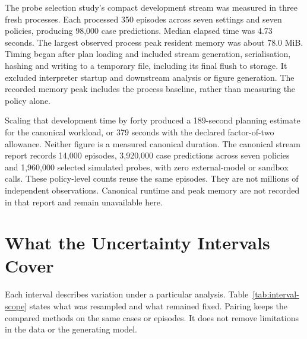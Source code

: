 The probe selection study's compact development stream was measured in three fresh processes. Each processed 350 episodes across seven settings
and seven policies, producing 98,000 case predictions. Median elapsed time was 4.73 seconds. The largest observed process
peak resident memory was about 78.0 MiB. Timing began after plan loading and included stream generation, serialisation,
hashing and writing to a temporary file, including its final flush to storage. It excluded interpreter startup and downstream
analysis or figure generation. The recorded memory peak includes the process baseline, rather than measuring the policy alone.

Scaling that development time by forty produced a 189-second planning estimate for the canonical workload, or 379 seconds
with the declared factor-of-two allowance. Neither figure is a measured canonical duration. The canonical stream report
records 14,000 episodes, 3,920,000 case predictions across seven policies and 1,960,000 selected simulated probes, with zero
external-model or sandbox calls. These policy-level counts reuse the same episodes. They are not millions of independent
observations. Canonical runtime and peak memory are not recorded in that report and remain unavailable here.


\section{What the Uncertainty Intervals Cover}
\suppressfloats[t]

Each interval describes variation under a particular analysis. Table~\ref{tab:interval-scope} states what was resampled
and what remained fixed. Pairing keeps the compared methods on the same cases or episodes. It does not remove limitations
in the data or the generating model.

